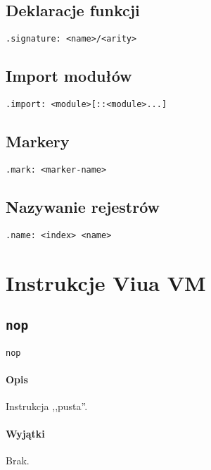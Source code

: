 \subsection{Deklaracje funkcji}

\begin{lstlisting}
.signature: <name>/<arity>
\end{lstlisting}

\subsection{Import modułów}

\begin{lstlisting}
.import: <module>[::<module>...]
\end{lstlisting}

\subsection{Markery}

\begin{lstlisting}
.mark: <marker-name>
\end{lstlisting}

\subsection{Nazywanie rejestrów}

\begin{lstlisting}
.name: <index> <name>
\end{lstlisting}

\section{Instrukcje Viua VM}

\subsection{\texttt{nop}}

\begin{lstlisting}
nop
\end{lstlisting}

\paragraph*{Opis} Instrukcja ,,pusta''.

\paragraph*{Wyjątki} Brak.

